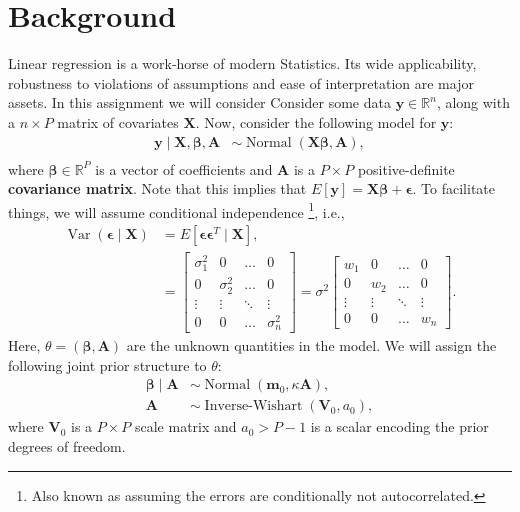 \documentclass[a4paper,10pt, notitlepage]{report}
\newcommand{\vr}{\operatorname{Var}} %
\newcommand{\bX}{ \boldsymbol{X}} %
\newcommand{\by}{ \boldsymbol{y} } %
\newcommand{\bb}{ \boldsymbol{\beta} }
\newcommand{\ba}{ \boldsymbol{A} }
\begin{document}
\section*{Background}
Linear regression is a work-horse of modern Statistics.
Its wide applicability, robustness to violations of assumptions and ease of interpretation are major assets. 
In this assignment we will consider 
Consider some data $\by \in \mathbb{R}^n$, along with a $n \times P$ matrix of covariates $\boldsymbol{X}$.
Now, consider the following model for $\boldsymbol{y}$:
\begin{align*}
    \by \mid \bX, \bb, \ba & \sim \operatorname{Normal}\left(\bX \bb, \ba\right),\\
\end{align*}
where $\bb \in \mathbb{R}^P$ is a vector of coefficients and  $\ba$ is a $P \times P$ positive-definite \textbf{covariance matrix}.
Note that this implies that $E[\by] = \bX\bb + \boldsymbol{\epsilon}$.
To facilitate things, we will assume conditional independence \footnote{Also known as assuming the errors are conditionally not autocorrelated.}, i.e.,
\begin{align*}
        \vr \left( \boldsymbol{\epsilon} \mid \bX \right) &= E \left[\boldsymbol{\epsilon} \boldsymbol{\epsilon}^T \mid \bX \right], \\
    &=  \begin{bmatrix}
   \sigma^2_{1} & 0& \ldots & 0\\ 
   0 & \sigma^2_{2} & \ldots &0\\ 
   \vdots & \vdots &  \ddots & \vdots \\ 
   0&  0 &  \ldots & \sigma^2_{n}
 \end{bmatrix} = \sigma^2 \begin{bmatrix}
   w_{1} & 0& \ldots & 0\\ 
   0 & w_{2} & \ldots &0\\ 
   \vdots & \vdots &  \ddots & \vdots \\ 
   0&  0 &  \ldots & w_{n}
 \end{bmatrix}.
\end{align*}
Here, $\theta = (\bb, \ba)$ are the unknown quantities in the model.
We will assign the following joint prior structure to $\theta$:
\begin{align*}
        \bb \mid \ba & \sim \operatorname{Normal}\left(\boldsymbol{m}_0, \kappa \ba\right),\\
    \ba &\sim \operatorname{Inverse-Wishart}(\boldsymbol{V}_0, a_0),
\end{align*}
where $\boldsymbol{V}_0$ is a $P \times P$ scale matrix and $a_0 > P- 1$ is a scalar encoding the prior degrees of freedom.
\end{document}
